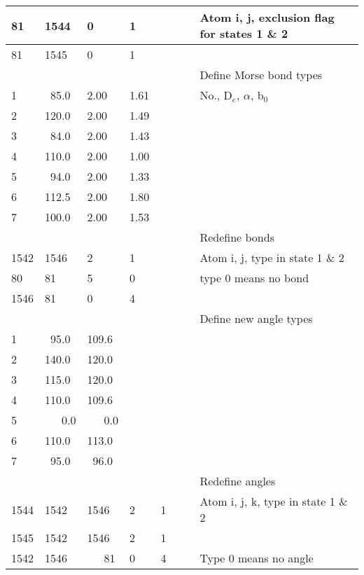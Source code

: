 \documentclass[a4paper,11pt]{article}
\begin{document}
\begin{longtable}{|p{35pt} p{35pt} p{35pt} p{35pt} p{35pt} p{35pt} p{35pt}| p{100pt}|}
  \hline 81 & 1544 & 0 & 1              &  &  &  & Atom i, j, exclusion flag for states 1 \& 2 \\
  \hline 81 & 1545 & 0 & 1              &  &  &  & \\
  \hline [bond{\_}types] &        &  &  &  &  &  & Define Morse bond types \\
  \hline 1 & ~85.0 & 2.00 & 1.61        &  &  &  & No., D$_e$, $\alpha$, b$_0$ \\
  \hline 2 & 120.0 & 2.00 & 1.49        &  &  &  & \\
  \hline 3 & ~84.0 & 2.00 & 1.43        &  &  &  & \\
  \hline 4 & 110.0 & 2.00 & 1.00        &  &  &  & \\
  \hline 5 & ~94.0 & 2.00 & 1.33        &  &  &  & \\
  \hline 6 & 112.5 & 2.00 & 1.80        &  &  &  & \\
  \hline 7 & 100.0 & 2.00 & 1.53        &  &  &  & \\
  \hline [change{\_}bonds] &      &  &  &  &  &  & Redefine bonds \\
  \hline 1542 & 1546 & 2 & 1            &  &  &  & Atom i, j, type in state 1 \& 2 \\
  \hline 80   &   81 & 5 & 0            &  &  &  & type 0 means no bond \\
  \hline 1546 &   81 & 0 & 4            &  &  &  & \\
  \hline [angle{\_}types] &       &  &  &  &  &  & Define new angle types \\
  \hline 1 & ~95.0 & 109.6           &  &  &  &  & \\
  \hline 2 & 140.0 & 120.0           &  &  &  &  & \\
  \hline 3 & 115.0 & 120.0           &  &  &  &  & \\
  \hline 4 & 110.0 & 109.6           &  &  &  &  & \\
  \hline 5 & ~~~0.0&~~~0.0           &  &  &  &  & \\
  \hline 6 & 110.0 & 113.0           &  &  &  &  & \\
  \hline 7 & ~95.0 & ~96.0           &  &  &  &  & \\
  \hline [change{\_}angles] &     &  &  &  &  &  & Redefine angles \\
  \hline 1544 & 1542 & 1546 & 2 & 1        &  &  & Atom i, j, k, type in state 1 \& 2 \\
  \hline 1545 & 1542 & 1546 & 2 & 1        &  &  & \\
  \hline 1542 & 1546 &~~~81 & 0 & 4        &  &  & Type 0 means no angle \\

\end{longtable}
\end{document}
